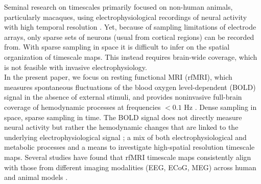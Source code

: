 \documentclass[latex/main.tex]{subfiles}
\begin{document}
Seminal research on timescales primarily focused on non-human animals, particularly macaques, using electrophysiological recordings of neural activity with high temporal resolution \cite{murray_hierarchy_2014, cirillo_neural_2018, nougaret_intrinsic_2021, manea_intrinsic_2022}. Yet, because of sampling limitations of electrode arrays, only sparse sets of neurons (usual from cortical regions) can be recorded from. With sparse sampling in space it is difficult to infer on the spatial organization of timescale maps. This instead requires brain-wide coverage, which is not feasible with invasive electrophysiology.\\

In the present paper, we focus on resting functional MRI (rfMRI), which measures spontaneous fluctuations of the blood oxygen level-dependent (BOLD) signal in the absence of external stimuli, and provides noninvasive full-brain coverage of hemodynamic processes at frequencies $<0.1$ Hz \cite{raut_hierarchical_2020, he_scale-free_2011}. Dense sampling in space, sparse sampling in time. The BOLD signal does not directly measure neural activity but rather the hemodynamic changes that are linked to the underlying electrophysiological signal \cite{logothetis_what_2008}; a mix of both electrophysiological and metabolic processes and a means to investigate high-spatial resolution timescale maps. Several studies have found that rfMRI timescale maps consistently align with those from different imaging modalities (EEG, ECoG, MEG) across human and animal models \cite{raut_hierarchical_2020, shafiei_topographic_2020, lurie_cortical_2024, mitra_lag_2014, kaneoke_variance_2012, wengler_distinct_2020, shinn_functional_2023, manea_intrinsic_2022, ito_cortical_2020, muller_core_2020}. \\
\end{document}
